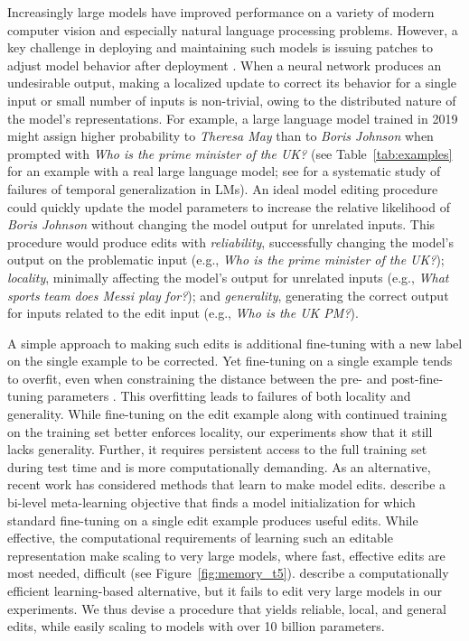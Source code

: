 \documentclass{article}
\newcommand{\cameraready}[1]{#1}
\begin{document}
\cameraready{Increasingly large models have improved performance on a variety of modern computer vision \citep{huang2017densely,chen2022autoscaling} and especially natural language processing \citep{vaswani2017attention,brown2020language} problems.} However, a key challenge in deploying and maintaining such models is issuing patches to adjust model behavior after deployment \citep{Sinitsin2020Editable}. When a neural network produces an undesirable output, making a localized update to correct its behavior for a single input or small number of inputs is non-trivial, owing to the distributed nature of the model's representations. For example, a large language model trained in 2019 might assign higher probability to \textit{Theresa May} than to \textit{Boris Johnson} when prompted with \textit{Who is the prime minister of the UK?} (see Table~\ref{tab:examples} for an example with a real large language model; \cameraready{see \citet{lazaridou2021mind} for a systematic study of failures of temporal generalization in LMs}). An ideal model editing procedure could quickly update the model parameters to increase the relative likelihood of \textit{Boris Johnson} without changing the model output for unrelated inputs. This procedure would produce edits with \textit{reliability}, successfully changing the model's output on the problematic input (e.g., \textit{Who is the prime minister of the UK?}); \textit{locality}, minimally affecting the model's output for unrelated inputs (e.g., \textit{What sports team does Messi play for?}); and \textit{generality}, generating the correct output for inputs related to the edit input (e.g., \textit{Who is the UK PM?}).

A simple approach to making such edits is additional fine-tuning with a new label on the single example to be corrected. Yet fine-tuning on a single example tends to overfit, even when constraining the distance between the pre- and post-fine-tuning parameters \citep{zhu2020modifying,Cao2021EditingFK}. This overfitting leads to failures of both locality and generality. While fine-tuning on the edit example along with continued training on the training set better enforces locality, our experiments show that it still lacks generality. Further, it requires persistent access to the full training set during test time and is more computationally demanding. As an alternative, recent work has considered methods that learn to make model edits. \citet{Sinitsin2020Editable} describe a bi-level meta-learning objective that finds a model initialization for which standard fine-tuning on a single edit example produces useful edits. While effective, the computational requirements of learning such an editable representation make scaling to very large models, where fast, effective edits are most needed, difficult (see Figure~\ref{fig:memory_t5}). \citet{Cao2021EditingFK} describe a computationally efficient learning-based alternative, but it fails to edit very large models in our experiments. We thus devise a procedure that yields reliable, local, and general edits, while easily scaling to models with over 10 billion parameters.
\end{document}
